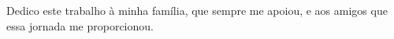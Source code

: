 Dedico este trabalho à minha família, que sempre me apoiou, e aos amigos que essa jornada me proporcionou.